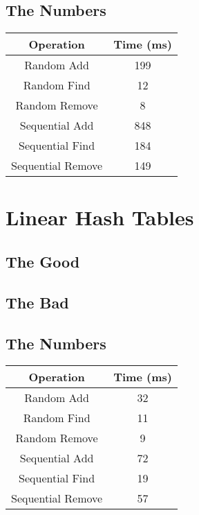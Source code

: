 \documentclass{muformallab}
\begin{document}
  \subsection{The Numbers}

  \begin{center}
    \begin{tabular}{c c}
      Operation & Time (ms) \\
      \hline
      Random Add & 199 \\
      Random Find & 12 \\
      Random Remove & 8 \\
      Sequential Add & 848 \\
      Sequential Find & 184 \\
      Sequential Remove & 149 \\
    \end{tabular}
  \end{center}

  \section{Linear Hash Tables}

  \subsection{The Good}

  \subsection{The Bad}

  \subsection{The Numbers}

  \begin{center}
    \begin{tabular}{c c}
      Operation & Time (ms) \\
      \hline
      Random Add & 32 \\
      Random Find & 11 \\
      Random Remove & 9 \\
      Sequential Add & 72 \\
      Sequential Find & 19 \\
      Sequential Remove & 57 \\
    \end{tabular}
  \end{center}
\end{document}
